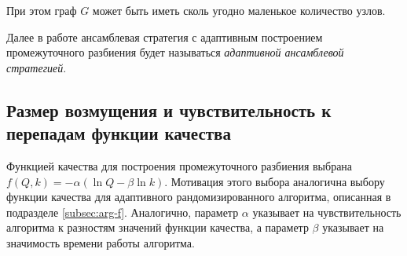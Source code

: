 При этом граф $G$ может быть иметь сколь угодно маленькое количество узлов.

Далее в работе ансамблевая стратегия с адаптивным построением промежуточного разбиения будет называться \emph{адаптивной ансамблевой стратегией}.



\subsection{Размер возмущения и чувствительность к перепадам функции качества}

Функцией качества для построения промежуточного разбиения выбрана $f(Q, k) = -\alpha(\ln Q - \beta \ln k)$. Мотивация этого выбора аналогична выбору функции качества для адаптивного рандомизированного алгоритма, описанная в подразделе \ref{subsec:arg-f}. Аналогично, параметр $\alpha$ указывает на чувствительность алгоритма к разностям значений функции качества, а параметр $\beta$ указывает на значимость времени работы алгоритма.

